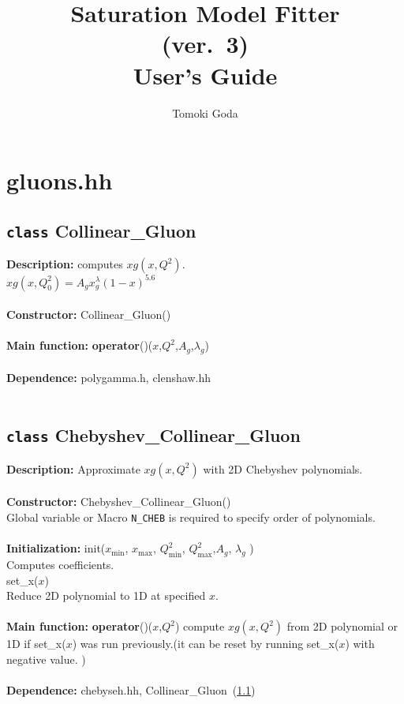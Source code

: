 \documentclass[12pt]{article}
\title{Saturation Model Fitter\\ (ver.~3)\\User's Guide}
\author{Tomoki Goda}
\newenvironment{entry}[1]{\textbf{\large #1:  }}{\\\vspace{3mm}\\}
\begin{document}
	\maketitle

\section{gluons.hh}
\subsection{\texttt{class} Collinear\_Gluon }\label{CollinearGluon}

\begin{entry}{Description}
computes $xg(x,Q^2)$.\\
$xg(x,Q_0^2)=A_g x^\lambda_g(1-x)^{5.6}$
\end{entry} 
\begin{entry}{Constructor}
	Collinear\_Gluon()
\end{entry} 
\begin{entry}{Main function}
	\textbf{operator}()($x$,$Q^2$,$A_g$,$\lambda_g$)
\end{entry} 
\begin{entry}{Dependence}
polygamma.h, clenshaw.hh
\end{entry}	


\subsection{\texttt{class} Chebyshev\_Collinear\_Gluon}\label{ChebyshevCollinearGluon}
\begin{entry}{Description}
	Approximate $xg(x,Q^2)$ with 2D Chebyshev polynomials. 
\end{entry}
\begin{entry}{Constructor}
	Chebyshev\_Collinear\_Gluon()\\
	Global variable or Macro \texttt{N\_CHEB} is required to specify order of polynomials.
\end{entry}
\begin{entry}{Initialization}
	init($x_{\mathrm{min}}$, $x_{\mathrm{max}}$, $Q^2_{\mathrm{min}}$, $Q^2_{\mathrm{max}}$,$A_g$, $\lambda_g$ )\\
	Computes coefficients.\\
	set\_x($x$)\\
	Reduce 2D polynomial to 1D at specified $x$. 
\end{entry}
\begin{entry}{Main function}
	\textbf{operator}()($x$,$Q^2$)
	compute $xg(x,Q^2)$ from 2D polynomial or 1D if set\_x($x$) was run previously.(it can be reset by running set\_x($x$) with negative value. ) 
\end{entry}
\begin{entry}{Dependence}
	chebyseh.hh, Collinear\_Gluon~(\ref{CollinearGluon})
\end{entry}
\end{document}
